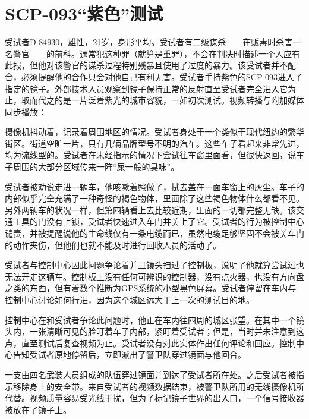 \section{SCP-093“紫色”测试}

\label{sec:DOC-scp-093-violet-test}


受试者D-84930，雄性，21岁，身形平均。受试者有二级谋杀——在贩毒时杀害一名警官——的前科。通常犯这种罪（就算是重罪），不会在判决时描述一个人应有此报，但他对该警官的谋杀过程特别残暴且使用了过度的暴力。该受试者并不配合，必须提醒他的合作只会对他自己有利无害。受试者手持紫色的SCP-093进入了指定的镜子。外部技术人员观察到镜子保持正常的反射直至受试者完全进入它为止，取而代之的是一片泛着紫光的城市容貌，一如初次测试。视频转播与附加媒体同步播放：

\begin{scpbox}

摄像机抖动着，记录着周围地区的情况。受试者身处于一个类似于现代纽约的繁华街区。街道空旷一片，只有几辆品牌型号不明的汽车。这些车子看起来非常先进，均为流线型的。受试者在未经指示的情况下尝试往车窗里面看，但很快返回，说车子周围的大部分区域传来一阵“屎一般的臭味”。

受试者被劝说走进一辆车，他咳嗽着照做了，拭去盖在一面车窗上的灰尘。车子的内部似乎完全充满了一种奇怪的褐色物体，里面除了这些褐色物体什么都看不见。另外两辆车的状况一样，但第四辆看上去比较近期，里面的一切都完整无缺。该交通工具的门没有上锁，受试者快速进入车门并关上了它。受试者的行为被控制中心谴责，并被提醒说他的生命线仅有一条电缆而已，虽然电缆足够坚固不会被关车门的动作夹伤，但他们也就不能及时进行回收人员的活动了。

受试者与控制中心因此问题争论着并且镜头扫过了控制板，说明了他就算尝试过也无法开走这辆车。控制板上没有任何可辨识的控制器，没有点火器，也没有方向盘之类的东西，但有着数个推断为GPS系统的小型黑色屏幕。受试者停留在车内与控制中心讨论如何行进，因为这个城区远大于上一次的测试目的地。

控制中心在和受试者争论此问题时，他正在车内往四周的城区张望。在其中一个镜头内，一张清晰可见的脸盯着车子内部，紧盯着受试者；但是，当时并未注意到这点，直至测试后复查视频为止。受试者没有对此实体作出任何评论和回应。控制中心告知受试者原地停留后，立即派出了警卫队穿过镜面与他回合。

一支由四名武装人员组成的队伍穿过镜面并到达了受试者所在处。之后受试者被指示移除身上的安全带。来自受试者的视频数据结束，被警卫队所用的无线摄像机所代替。视频质量容易受光线干扰，但为了标记镜子世界的出入口，一个信号接收器被放在了镜子上。


\end{scpbox}
